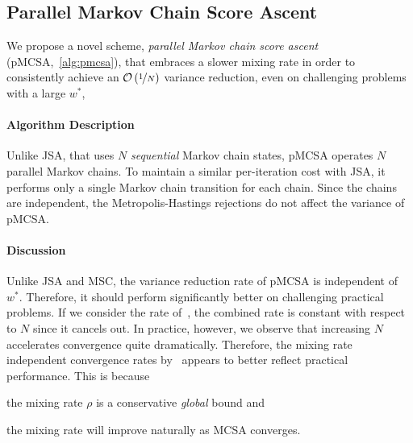 \vspace{-0.1in}
\subsection{Parallel Markov Chain Score Ascent}
\vspace{-0.07in}
We propose a novel scheme, \textit{parallel Markov chain score ascent} (pMCSA,~\cref{alg:pmcsa}), that embraces a slower mixing rate in order to consistently achieve an \(\mathcal{O}\left(\nicefrac{1}{N}\right)\) variance reduction, even on challenging problems with a large \(w^*\),  


\vspace{-0.12in}
\paragraph{Algorithm Description}
Unlike JSA, that uses \(N\) \textit{sequential} Markov chain states, pMCSA operates \(N\) parallel Markov chains.
To maintain a similar per-iteration cost with JSA, it performs only a single Markov chain transition for each chain.
Since the chains are independent, the Metropolis-Hastings rejections do not affect the variance of pMCSA.
\vspace{0.1in}



\vspace{-0.1in}
\paragraph{Discussion}
Unlike JSA and MSC, the variance reduction rate of pMCSA is independent of \(w^*\).
Therefore, it should perform significantly better on challenging practical problems.
If we consider the rate of~\citet{duchi_ergodic_2012}, the combined rate is constant with respect to \(N\) since it cancels out.
In practice, however, we observe that increasing \(N\) accelerates convergence quite dramatically.
Therefore, the mixing rate independent convergence rates by~\citet{doan_finitetime_2020, doan_convergence_2020} appears to better reflect practical performance.
This is because
\begin{enumerate*}[label=\textbf{(\roman*)}]
  \item the mixing rate \(\rho\) is a conservative \textit{global} bound and 
  \item the mixing rate will improve naturally as MCSA converges.
\end{enumerate*}


